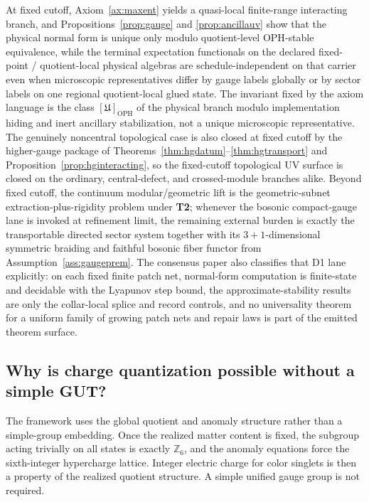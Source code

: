 \documentclass[11pt]{article}
\begin{document}
At fixed cutoff, Axiom~\ref{ax:maxent} yields a quasi-local finite-range interacting branch, and Propositions~\ref{prop:gauge} and \ref{prop:ancillauv} show that the physical normal form is unique only modulo quotient-level OPH-stable equivalence, while the terminal expectation functionals on the declared fixed-point / quotient-local physical algebras are schedule-independent on that carrier even when microscopic representatives differ by gauge labels globally or by sector labels on one regional quotient-local glued state. The invariant fixed by the axiom language is the class \([\mathfrak U]_{\mathrm{OPH}}\) of the physical branch modulo implementation hiding and inert ancillary stabilization, not a unique microscopic representative. The genuinely noncentral topological case is also closed at fixed cutoff by the higher-gauge package of Theorems~\ref{thm:hgdatum}--\ref{thm:hgtransport} and Proposition~\ref{prop:hginteracting}, so the fixed-cutoff topological UV surface is closed on the ordinary, central-defect, and crossed-module branches alike. Beyond fixed cutoff, the continuum modular/geometric lift is the geometric-subnet extraction-plus-rigidity problem under \textbf{T2}; whenever the bosonic compact-gauge lane is invoked at refinement limit, the remaining external burden is exactly the transportable directed sector system together with its \(3+1\)-dimensional symmetric braiding and faithful bosonic fiber functor from Assumption~\ref{ass:gaugeprem}.
The consensus paper also classifies that D1 lane explicitly: on each fixed finite patch net,
normal-form computation is finite-state and decidable with the Lyapunov step bound, the
approximate-stability results are only the collar-local splice and record controls, and no
universality theorem for a uniform family of growing patch nets and repair laws is part of the
emitted theorem surface.

\subsection{Why is charge quantization possible without a simple GUT?}

The framework uses the global quotient and anomaly structure rather than a simple-group embedding. Once the realized matter content is fixed, the subgroup acting trivially on all states is exactly $\mathbb Z_6$, and the anomaly equations force the sixth-integer hypercharge lattice. Integer electric charge for color singlets is then a property of the realized quotient structure. A simple unified gauge group is not required.
\end{document}
